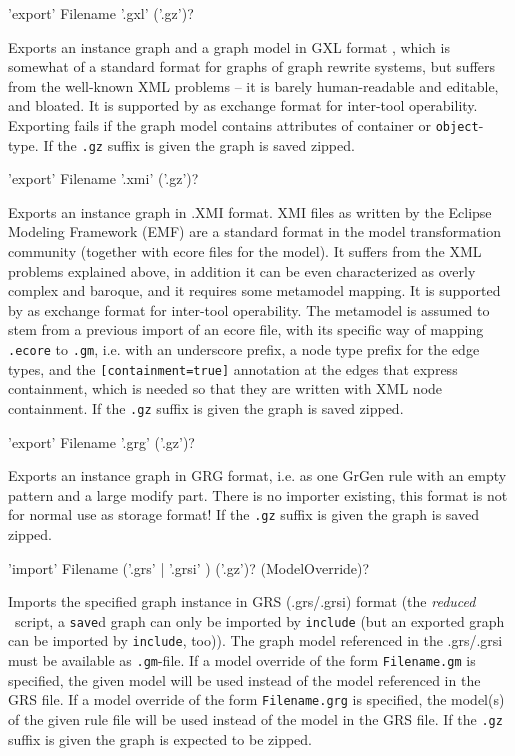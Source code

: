 \begin{rail}
  'export' Filename '.gxl' ('.gz')?
\end{rail}
Exports an instance graph and a graph model in GXL format \cite{GXL,GXL2},
which is somewhat of a standard format for graphs of graph rewrite systems,
but suffers from the well-known XML problems -- it is barely human-readable and editable, and bloated.
It is supported by \GrG{} as exchange format for inter-tool operability.
Exporting fails if the graph model contains attributes of container or \texttt{object}-type.
If the \texttt{.gz} suffix is given the graph is saved zipped.

\begin{rail}
  'export' Filename '.xmi' ('.gz')?
\end{rail}
Exports an instance graph in .XMI format.
XMI files as written by the Eclipse Modeling Framework (EMF) are a standard format in the model transformation community (together with ecore files for the model).
It suffers from the XML problems explained above, in addition it can be even characterized as overly complex and baroque, and it requires some metamodel mapping.
It is supported by \GrG{} as exchange format for inter-tool operability.
The metamodel is assumed to stem from a previous import of an ecore file, with its specific way of mapping \texttt{.ecore} to \texttt{.gm}, i.e. with an underscore prefix, a node type prefix for the edge types, and the \verb#[containment=true]# annotation at the edges that express containment, which is needed so that they are written with XML node containment.
If the \texttt{.gz} suffix is given the graph is saved zipped.


\begin{rail}
  'export' Filename '.grg' ('.gz')?
\end{rail}
Exports an instance graph in GRG format, i.e. as one GrGen rule with an empty pattern and a large modify part.
There is no importer existing, this format is not for normal use as storage format!
If the \texttt{.gz} suffix is given the graph is saved zipped.

\begin{rail}
  'import' Filename ('.grs' | '.grsi' ) ('.gz')? (ModelOverride)?
\end{rail}
Imports the specified graph instance in GRS (.grs/.grsi) format (the \emph{reduced} \GrShell\ script,
a \texttt{save}d graph can only be imported by \texttt{include} (but an exported graph can be imported by \texttt{include}, too)).
The graph model referenced in the .grs/.grsi must be available as \texttt{.gm}-file.
If a model override of the form \texttt{Filename.gm} is specified, the given model will be used instead of the model referenced in the GRS file.
If a model override of the form \texttt{Filename.grg} is specified, the model(s) of the given rule file will be used instead of the model in the GRS file.
If the \texttt{.gz} suffix is given the graph is expected to be zipped.

